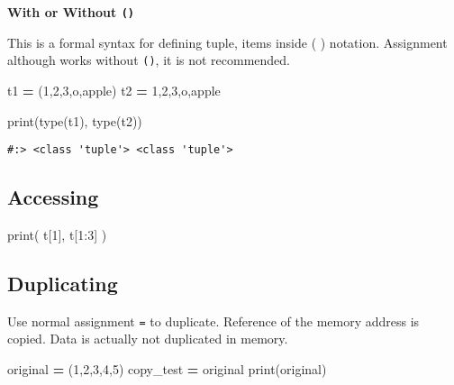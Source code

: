 \documentclass[
]{book}
\newenvironment{Shaded}{\begin{snugshade}}{\end{snugshade}}
\newcommand{\BuiltInTok}[1]{#1}
\newcommand{\DecValTok}[1]{\textcolor[rgb]{0.06,0.06,0.06}{#1}}
\newcommand{\NormalTok}[1]{#1}
\newcommand{\OperatorTok}[1]{\textcolor[rgb]{0.43,0.43,0.43}{\textbf{#1}}}
\newcommand{\StringTok}[1]{\textcolor[rgb]{0.5,0.5,0.5}{#1}}
\begin{document}
\textbf{With or Without \texttt{()} }

This is a formal syntax for defining tuple, items inside ( ) notation. Assignment although works without \texttt{()}, it is not recommended.

\begin{Shaded}
\begin{Highlighting}[]
\NormalTok{t1 }\OperatorTok{=}\NormalTok{ (}\DecValTok{1}\NormalTok{,}\DecValTok{2}\NormalTok{,}\DecValTok{3}\NormalTok{,}\StringTok{\textquotesingle{}o\textquotesingle{}}\NormalTok{,}\StringTok{\textquotesingle{}apple\textquotesingle{}}\NormalTok{)}
\NormalTok{t2 }\OperatorTok{=} \DecValTok{1}\NormalTok{,}\DecValTok{2}\NormalTok{,}\DecValTok{3}\NormalTok{,}\StringTok{\textquotesingle{}o\textquotesingle{}}\NormalTok{,}\StringTok{\textquotesingle{}apple\textquotesingle{}}

\BuiltInTok{print}\NormalTok{(}\BuiltInTok{type}\NormalTok{(t1), }\BuiltInTok{type}\NormalTok{(t2))}
\end{Highlighting}
\end{Shaded}

\begin{verbatim}
#:> <class 'tuple'> <class 'tuple'>
\end{verbatim}

\hypertarget{accessing}{%
\subsection{Accessing}\label{accessing}}

\begin{Shaded}
\begin{Highlighting}[]
\BuiltInTok{print}\NormalTok{( t[}\DecValTok{1}\NormalTok{], t[}\DecValTok{1}\NormalTok{:}\DecValTok{3}\NormalTok{] )}
\end{Highlighting}
\end{Shaded}

\hypertarget{duplicating}{%
\subsection{Duplicating}\label{duplicating}}

Use normal assignment \texttt{=} to duplicate. Reference of the memory address is copied. Data is actually not duplicated in memory.

\begin{Shaded}
\begin{Highlighting}[]
\NormalTok{original }\OperatorTok{=}\NormalTok{ (}\DecValTok{1}\NormalTok{,}\DecValTok{2}\NormalTok{,}\DecValTok{3}\NormalTok{,}\DecValTok{4}\NormalTok{,}\DecValTok{5}\NormalTok{)}
\NormalTok{copy\_test }\OperatorTok{=}\NormalTok{ original}
\BuiltInTok{print}\NormalTok{(original)}
\end{Highlighting}
\end{Shaded}
\end{document}
